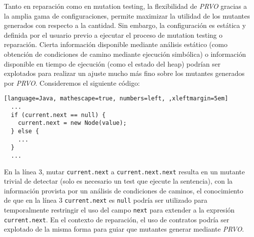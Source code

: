 Tanto en reparaci\'on como en mutation testing, la flexibilidad de \emph{PRVO} gracias a la amplia gama de configuraciones, permite maximizar la utilidad de los mutantes generados con respecto a la cantidad. Sin embargo, la configuraci\'on es est\'atica y definida por el usuario previo a ejecutar el proceso de mutation testing o reparaci\'on. Cierta informaci\'on disponible mediante an\'alisis est\'atico (como obtenci\'on de condiciones de camino mediante ejecuci\'on simb\'olica) o informaci\'on disponible en tiempo de ejecuci\'on (como el estado del heap) podr\'ian ser explotados para realizar un ajuste mucho m\'as fino sobre los mutantes generados por \emph{PRVO}. Consideremos el siguiente c\'odigo:
\begin{lstlisting}[language=Java, mathescape=true, numbers=left, ,xleftmargin=5em]
  ...
  if (current.next == null) {
    current.next = new Node(value);
  } else {
    ...
  }
  ...
\end{lstlisting}
En la l\'inea $3$, mutar \texttt{current.next} a \texttt{current.next.next} resulta en un mutante trivial de detectar (solo es necesario un test que ejecute la sentencia), con la informaci\'on provista por un an\'alisis de condiciones de caminos, el conocimiento de que en la l\'inea $3$ \texttt{current.next} es \texttt{null} podr\'ia ser utilizado para temporalmente restringir el uso del campo \texttt{next} para extender a la expresi\'on \texttt{current.next}.
En el contexto de reparaci\'on, el uso de contratos podr\'ia ser explotado de la misma forma para guiar que mutantes generar mediante \emph{PRVO}.

